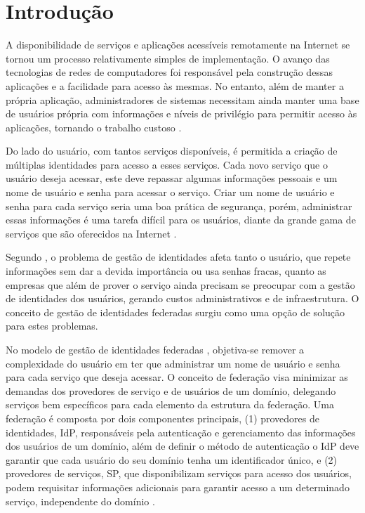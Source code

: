 \chapter{Introdução}
\label{c_introducao}

A disponibilidade de serviços e aplicações acessíveis remotamente na Internet se tornou um processo relativamente simples de implementação. O avanço das tecnologias de redes de computadores foi responsável pela construção dessas aplicações e a facilidade para acesso às mesmas. No entanto, além de manter a própria aplicação, administradores de sistemas necessitam ainda manter uma base de usuários própria com informações e níveis de privilégio para permitir acesso às aplicações, tornando o trabalho custoso \cite{moreira:11}. 

Do lado do usuário, com tantos serviços disponíveis, é permitida a criação de múltiplas identidades para acesso a esses serviços. Cada novo serviço que o usuário deseja acessar, este deve repassar algumas informações pessoais e um nome de usuário e senha para acessar o serviço. Criar um nome de usuário e senha para cada serviço seria uma boa prática de segurança, porém, administrar essas informações é uma tarefa difícil para os usuários, diante da grande gama de serviços que são oferecidos na Internet \cite{wangham:10a}.
	
Segundo \cite{kallela:08, wangham:10b}, o problema de gestão de identidades afeta tanto o usuário, que repete informações sem dar a devida importância ou usa senhas fracas, quanto as empresas que além de prover o serviço ainda precisam se preocupar com a gestão de identidades dos usuários, gerando custos administrativos e de infraestrutura. O conceito de gestão de identidades federadas surgiu como uma opção de solução para estes problemas.

No modelo de gestão de identidades federadas \cite{josan:05, pope:05, bhargav:07}, objetiva-se remover a complexidade do usuário em ter que administrar um nome de usuário e senha para cada serviço que deseja acessar. O conceito de federação visa minimizar as demandas dos provedores de serviço e de usuários de um domínio, delegando serviços bem específicos para cada elemento da estrutura da federação. Uma federação é composta por dois componentes principais, (1) provedores de identidades, \ac{IdP}, responsáveis pela autenticação e gerenciamento das informações dos usuários de um domínio, além de definir o método de autenticação o IdP deve garantir que cada usuário do seu domínio tenha um identificador único, e (2) provedores de serviços, \ac{SP}, que disponibilizam serviços para acesso dos usuários, podem requisitar informações adicionais para garantir acesso a um determinado serviço, independente do domínio \cite{moreira:11}.
	
